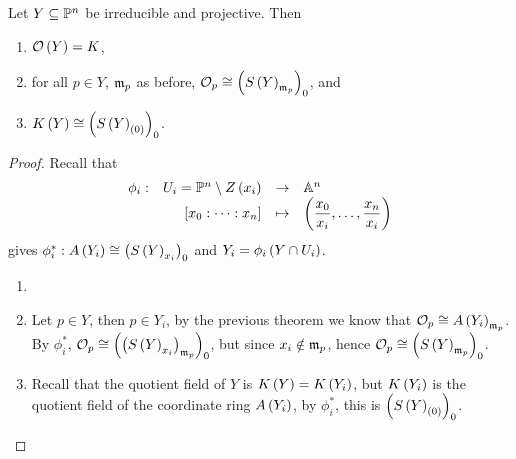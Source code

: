 \begin{theorem}
Let $ Y \subseteq \P^n $ be irreducible and projective. Then
\begin{enumerate}
\item $ \OO\rb{Y} = K $,
\item for all $ p \in Y $, $ \mm_p $ as before, $ \OO_p \cong \rb{S\rb{Y}_{\mm_p}}_0 $, and
\item $ K\rb{Y} \cong \rb{S\rb{Y}_{\rb{0}}}_0 $.
\end{enumerate}
\end{theorem}

\begin{proof}
Recall that
$$ \function[\phi_i]{U_i = \P^n \setminus Z\rb{x_i}}{\A^n}{\sb{x_0 : \dots : x_n}}{\rb{\dfrac{x_0}{x_i}, \dots, \dfrac{x_n}{x_i}}} $$
gives $ \phi_i^* : A\rb{Y_i} \cong \rb{S\rb{Y}_{x_i}}_0 $ and $ Y_i = \phi_i\rb{Y \cap U_i} $.
\begin{enumerate}
\item
\item Let $ p \in Y $, then $ p \in Y_i $, by the previous theorem we know that $ \OO_p \cong A\rb{Y_i}_{\mm_p} $. By $ \phi_i^* $, $ \OO_p \cong \rb{\rb{S\rb{Y}_{x_i}}_{\mm_p}}_0 $, but since $ x_i \notin \mm_p $, hence $ \OO_p \cong \rb{S\rb{Y}_{\mm_p}}_0 $.
\item Recall that the quotient field of $ Y $ is $ K\rb{Y} = K\rb{Y_i} $, but $ K\rb{Y_i} $ is the quotient field of the coordinate ring $ A\rb{Y_i} $, by $ \phi_i^* $, this is $ \rb{S\rb{Y}_{\rb{0}}}_0 $.
\end{enumerate}
\end{proof}


